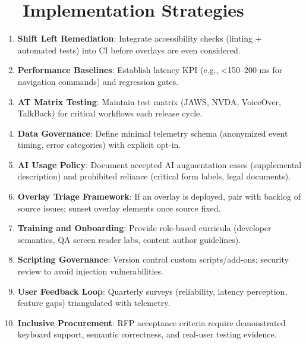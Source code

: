 \section{~~Implementation Strategies}
\label{sec:ch28-implementation}
\begin{enumerate}
	\item \textbf{Shift Left Remediation}: Integrate accessibility checks (linting + automated tests) into CI before overlays are even considered.
	\item \textbf{Performance Baselines}: Establish latency KPI (e.g., <150–200 ms for navigation commands) and regression gates\supercite{Fowler2011ScreenReaderLatency}.
	\item \textbf{AT Matrix Testing}: Maintain test matrix (JAWS, NVDA, VoiceOver, TalkBack) for critical workflows each release cycle.
	\item \textbf{Data Governance}: Define minimal telemetry schema (anonymized event timing, error categories) with explicit opt-in\supercite{DataPrivacyAI}.
	\item \textbf{AI Usage Policy}: Document accepted AI augmentation cases (supplemental description) and prohibited reliance (critical form labels, legal documents).
	\item \textbf{Overlay Triage Framework}: If an overlay is deployed, pair with backlog of source issues; sunset overlay elements once source fixed.
	\item \textbf{Training and Onboarding}: Provide role-based curricula (developer semantics, QA screen reader labs, content author guidelines).
	\item \textbf{Scripting Governance}: Version control custom scripts/add-ons; security review to avoid injection vulnerabilities.
	\item \textbf{User Feedback Loop}: Quarterly surveys (reliability, latency perception, feature gaps) triangulated with telemetry.
	\item \textbf{Inclusive Procurement}: RFP acceptance criteria require demonstrated keyboard support, semantic correctness, and real-user testing evidence.
\end{enumerate}

